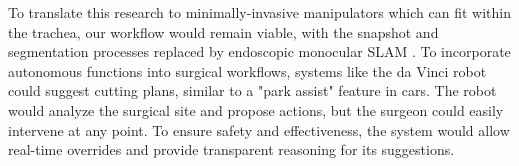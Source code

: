To translate this research to minimally-invasive manipulators which can fit within the trachea, our workflow would remain viable, with the snapshot and segmentation processes replaced by endoscopic monocular SLAM \cite{Masoumian2022, Liu2022}. To incorporate autonomous functions into surgical workflows, systems like the da Vinci robot could suggest cutting plans, similar to a "park assist" feature in cars. The robot would analyze the surgical site and propose actions, but the surgeon could easily intervene at any point. To ensure safety and effectiveness, the system would allow real-time overrides and provide transparent reasoning for its suggestions.



\vspace{12pt}